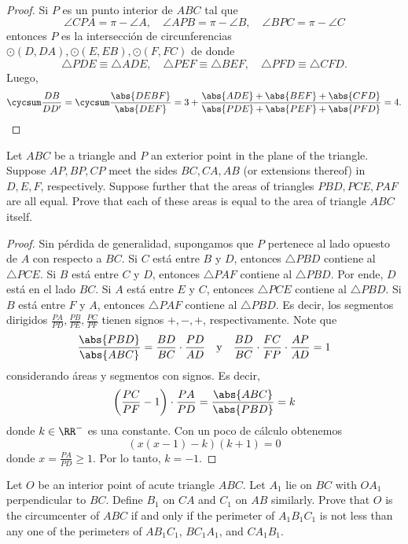 \begin{proof}
	Si $P$ es un punto interior de $ABC$ tal que
	\[\angle CPA=\pi-\angle A,\quad\angle APB=\pi-\angle B,\quad\angle BPC=\pi-\angle C\]
	entonces $P$ es la intersección de circunferencias $\odot(D,DA),\odot(E,EB),\odot(F,FC)$ de donde
	\[\triangle PDE\equiv\triangle ADE,\quad\triangle PEF\equiv\triangle BEF,\quad\triangle PFD\equiv\triangle CFD.\]
	Luego,
	\[\cycsum\frac{DB}{DD'}=\cycsum\frac{\abs{DEBF}}{\abs{DEF}}=3+\frac{\abs{ADE}+\abs{BEF}+\abs{CFD}}{\abs{PDE}+\abs{PEF}+\abs{PFD}}=4.\]
\end{proof}

\begin{probEG}
	Let $ABC$ be a triangle and $P$ an exterior point in the plane of the triangle. Suppose $AP,BP,CP$ meet the sides $BC,CA,AB$ (or extensions thereof) in $D,E,F$, respectively. Suppose further that the areas of triangles $PBD,PCE,PAF$ are all equal. Prove that each of these areas is equal to the area of triangle $ABC$ itself.
\end{probEG}

\begin{proof}
	Sin pérdida de generalidad, supongamos que $P$ pertenece al lado opuesto de $A$ con respecto a $BC$. Si $C$ está entre $B$ y $D$, entonces $\triangle PBD$ contiene al $\triangle PCE$. Si $B$ está entre $C$ y $D$, entonces $\triangle PAF$ contiene al $\triangle PBD$. Por ende, $D$ está en el lado $BC$. Si $A$ está entre $E$ y $C$, entonces $\triangle PCE$ contiene al $\triangle PBD$. Si $B$ está entre $F$ y $A$, entonces $\triangle PAF$ contiene al $\triangle PBD$. Es decir, los segmentos dirigidos $\frac{PA}{PD},\frac{PB}{PE},\frac{PC}{PF}$ tienen signos $+,-,+$, respectivamente. Note que
	\[\frac{\abs{PBD}}{\abs{ABC}}=\frac{BD}{BC}\cdot\frac{PD}{AD}\quad\text{y}\quad\frac{BD}{BC}\cdot\frac{FC}{FP}\cdot\frac{AP}{AD}=1\]
	considerando áreas y segmentos con signos. Es decir,
	\[\left(\frac{PC}{PF}-1\right)\cdot\frac{PA}{PD}=\frac{\abs{ABC}}{\abs{PBD}}=k\]
	donde $k\in\RR^-$ es una constante. Con un poco de cálculo obtenemos
	\[(x(x-1)-k)(k+1)=0\]
	donde $x=\frac{PA}{PD}\ge 1$. Por lo tanto, $k=-1$.
\end{proof}

\begin{probEG}
	Let $O$ be an interior point of acute triangle $ABC$. Let $A_1$ lie on $BC$ with $OA_1$ perpendicular to $BC$. Define $B_1$ on $CA$ and $C_1$ on $AB$ similarly. Prove that $O$ is the circumcenter of $ABC$ if and only if the perimeter of $A_1B_1C_1$ is not less than any one of the perimeters of $AB_1C_1$, $BC_1A_1$, and $CA_1B_1$.
\end{probEG}

